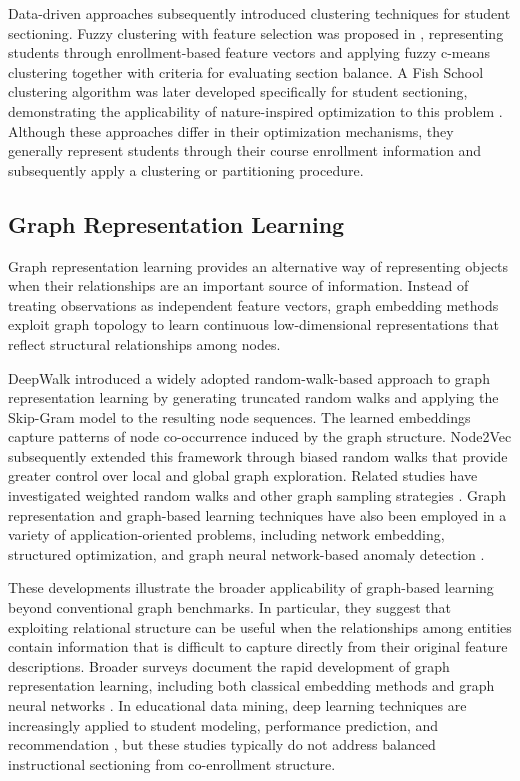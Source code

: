 \documentclass[pdflatex,sn-mathphys-num,iicol]{sn-jnl}%
\theoremstyle{thmstyleone}%
\theoremstyle{thmstyletwo}%
\theoremstyle{thmstylethree}%
\begin{document}
Data-driven approaches subsequently introduced clustering techniques for student sectioning. Fuzzy clustering with feature selection was proposed in \cite{Amintoosi2005Feature}, representing students through enrollment-based feature vectors and applying fuzzy c-means clustering together with criteria for evaluating section balance. A Fish School clustering algorithm was later developed specifically for student sectioning, demonstrating the applicability of nature-inspired optimization to this problem \cite{Amintoosi2007FishSchool}. Although these approaches differ in their optimization mechanisms, they generally represent students through their course enrollment information and subsequently apply a clustering or partitioning procedure.

\subsection{Graph Representation Learning}

Graph representation learning provides an alternative way of representing objects when their relationships are an important source of information. Instead of treating observations as independent feature vectors, graph embedding methods exploit graph topology to learn continuous low-dimensional representations that reflect structural relationships among nodes.

DeepWalk \cite{perozzi2014deepwalk} introduced a widely adopted random-walk-based approach to graph representation learning by generating truncated random walks and applying the Skip-Gram model to the resulting node sequences. The learned embeddings capture patterns of node co-occurrence induced by the graph structure. Node2Vec \cite{node2vec_grover2016} subsequently extended this framework through biased random walks that provide greater control over local and global graph exploration. Related studies have investigated weighted random walks and other graph sampling strategies \cite{Qi2024Weighted}. Graph representation and graph-based learning techniques have also been employed in a variety of application-oriented problems, including network embedding, structured optimization, and graph neural network-based anomaly detection \cite{AlJreidy2024Clustering,Solgi2022GraphPrototypical,Luo2022LinkPrediction}.

These developments illustrate the broader applicability of graph-based learning beyond conventional graph benchmarks. In particular, they suggest that exploiting relational structure can be useful when the relationships among entities contain information that is difficult to capture directly from their original feature descriptions. Broader surveys document the rapid development of graph representation learning, including both classical embedding methods and graph neural networks \cite{Khoshraftar2024GRL}. In educational data mining, deep learning techniques are increasingly applied to student modeling, performance prediction, and recommendation \cite{Lin2025EDM}, but these studies typically do not address balanced instructional sectioning from co-enrollment structure.
\end{document}
